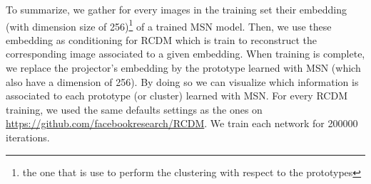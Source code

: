 \documentclass{article} %
\begin{document}
To summarize, we gather for every images in the training set their embedding (with dimension size of 256)\footnote{the one that is use to perform the clustering with respect to the prototypes} of a trained MSN model. Then, we use these embedding as conditioning for RCDM which is train to reconstruct the corresponding image associated to a given embedding. When training is complete, we replace the projector's embedding by the prototype learned with MSN (which also have a dimension of 256). By doing so we can visualize which information is associated to each prototype (or cluster) learned with MSN. For every RCDM training, we used the same defaults settings as the ones on \url{https://github.com/facebookresearch/RCDM}. We train each network for 200000 iterations.


\end{document}
